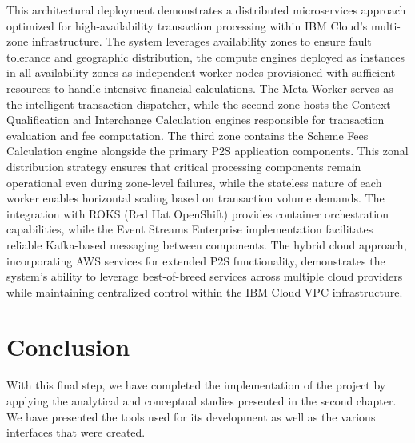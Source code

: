 This architectural deployment demonstrates a distributed microservices approach optimized for high-availability transaction processing within IBM Cloud's multi-zone infrastructure. The system leverages  availability zones to ensure fault tolerance and geographic distribution, the compute engines deployed as instances in all availability zones as independent worker nodes provisioned with sufficient resources  to handle intensive financial calculations. 
The Meta Worker serves as the intelligent transaction dispatcher, while the second zone hosts the Context Qualification and Interchange Calculation engines responsible for transaction evaluation and fee computation. The third zone contains the Scheme Fees Calculation engine alongside the primary P2S application components.
This zonal distribution strategy ensures that critical processing components remain operational even during zone-level failures, while the stateless nature of each worker enables horizontal scaling based on transaction volume demands. The integration with ROKS (Red Hat OpenShift) provides container orchestration capabilities, while the Event Streams Enterprise implementation facilitates reliable Kafka-based messaging between components. The hybrid cloud approach, incorporating AWS services for extended P2S functionality, demonstrates the system's ability to leverage best-of-breed services across multiple cloud providers while maintaining centralized control within the IBM Cloud VPC infrastructure.




\section{Conclusion}
With this final step, we have completed the implementation of the project by applying the analytical and conceptual studies presented in the second chapter. We have presented the tools used for its development as well as the various interfaces that were created.
\pagebreak
